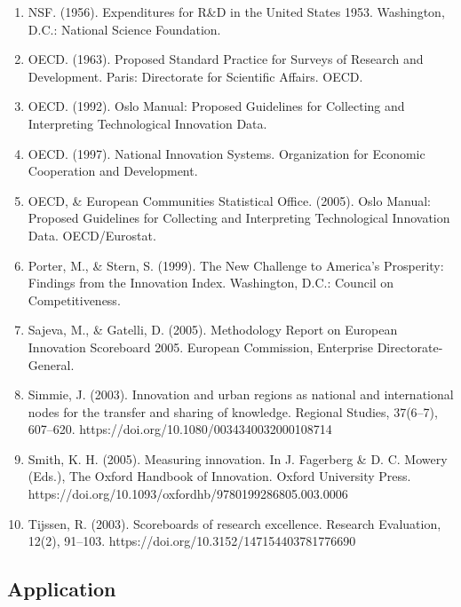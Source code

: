 \documentclass[a4paper,11pt]{article}
\begin{document}
\begin{enumerate}
\item NSF. (1956). Expenditures for R\&D in the United States 1953. Washington, D.C.: National Science Foundation.
\item OECD. (1963). Proposed Standard Practice for Surveys of Research and Development. Paris: Directorate for Scientific Affairs. OECD.
\item OECD. (1992). Oslo Manual: Proposed Guidelines for Collecting and Interpreting Technological Innovation Data.
\item OECD. (1997). National Innovation Systems. Organization for Economic Cooperation and Development.
\item OECD, \& European Communities Statistical Office. (2005). Oslo Manual: Proposed Guidelines for Collecting and Interpreting Technological Innovation Data. OECD/Eurostat.
\item Porter, M., \& Stern, S. (1999). The New Challenge to America’s Prosperity: Findings from the Innovation Index. Washington, D.C.: Council on Competitiveness.
\item Sajeva, M., \& Gatelli, D. (2005). Methodology Report on European Innovation Scoreboard 2005. European Commission, Enterprise Directorate-General.
\item Simmie, J. (2003). Innovation and urban regions as national and international nodes for the transfer and sharing of knowledge. Regional Studies, 37(6–7), 607–620. https://doi.org/10.1080/0034340032000108714
\item Smith, K. H. (2005). Measuring innovation. In J. Fagerberg \& D. C. Mowery (Eds.), The Oxford Handbook of Innovation. Oxford University Press. https://doi.org/10.1093/oxfordhb/9780199286805.003.0006
\item Tijssen, R. (2003). Scoreboards of research excellence. Research Evaluation, 12(2), 91–103. https://doi.org/10.3152/147154403781776690
\end{enumerate}

\subsection{Application}
\end{document}
